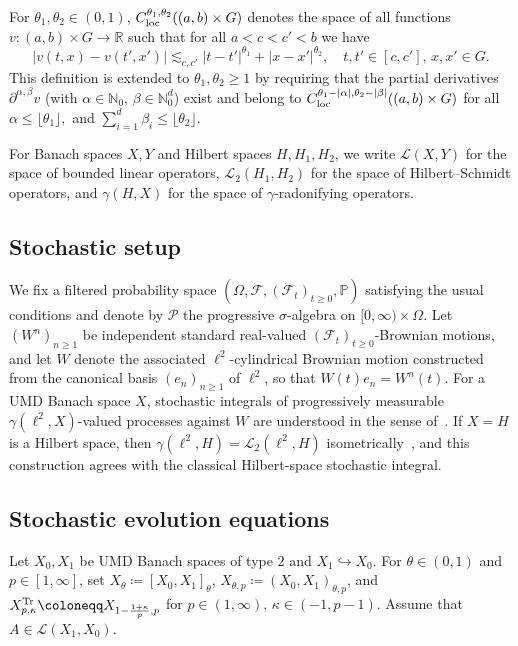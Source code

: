\documentclass[reqno]{amsart}
\newcommand{\N}{\mathbb{N}}
\newcommand{\R}{\mathbb{R}}
\newcommand{\F}{\mathscr{F}}
\newcommand{\sP}{\mathscr{P}}
\newcommand{\sL}{\mathscr{L}}
\newcommand{\ce}{\coloneqq}
\newcommand{\1}{\mathbf{1}}
\newcommand{\loc}{\textup{loc}}
\begin{document}
For $\theta_1,\theta_2\in (0,1)$, $C_\loc^{\theta_1,\theta_2}((a,b)\times G)$ denotes the space of all functions $v\colon (a,b)\times G\to \R$ such that for all $a<c<c'<b$ we have 
$$|v(t,x)-v(t',x')|\lesssim_{c,c'} |t-t'|^{\theta_1}+|x-x'|^{\theta_2}, \quad t,t' \in [c,c'],\,  x,x'\in G.$$
This definition is extended to $\theta_1,\theta_2\ge 1$ by requiring that the partial derivatives $\partial^{\alpha,\beta} v$ (with $\alpha\in \N_0$, $\beta\in \N_0^d$) exist and belong to $C_\loc^{\theta_1-|\alpha|, \theta_2-|\beta|}((a,b)\times G)$ for all $\alpha\le \lfloor \theta_1\rfloor,$ and $\sum_{i=1}^d \beta_i \le \lfloor \theta_2\rfloor$. 

For Banach spaces $X,Y$ and Hilbert spaces $H, H_1, H_2$, we write $\sL(X,Y)$ for the space of bounded linear operators, $\sL_2(H_1,H_2)$ for the space of Hilbert--Schmidt operators, and $\gamma(H,X)$ for the space of $\gamma$-radonifying operators.

\subsection{Stochastic setup}\label{subsec:stochastic_setup}
We fix a filtered probability space $(\Omega,\F,(\F_t)_{t\geq 0}, \mathbb{P})$ satisfying the usual conditions and denote by $\sP$ the progressive $\sigma$-algebra on $[0, \infty)\times\Omega$. Let $(W^n)_{n\geq1}$ be independent standard real-valued $(\F_t)_{t\geq0}$-Brownian motions, and let $W$ denote the associated $\ell^2$-cylindrical Brownian motion constructed from the canonical basis $(e_n)_{n\geq1}$ of $\ell^2$, so that $W(t)e_n=W^n(t)$. For a UMD Banach space $X$, stochastic integrals of progressively measurable $\gamma(\ell^2,X)$-valued processes against $W$ are understood in the sense of~\cite{vanneervenStochasticIntegrationBanach2015}. If $X=H$ is a Hilbert space, then $\gamma(\ell^2,H)=\sL_2(\ell^2,H)$ isometrically~\cite[Ch.~9]{hytonenAnalysisBanachSpaces2017}, and this construction agrees with the classical Hilbert-space stochastic integral. 

\subsection{Stochastic evolution equations}
Let $X_0,X_1$ be UMD Banach spaces of type $2$ and  $X_1\hookrightarrow X_0$. For $\theta\in(0,1)$ and $p\in[1,\infty]$, set
$    X_\theta\ce [X_0,X_1]_\theta
$, $X_{\theta,p}\ce (X_0,X_1)_{\theta,p}$, and $X_{p,\kappa}^{\textup{Tr}}\ce X_{1-\frac{1+\kappa}{p},p}$ for $p\in (1,\infty)$, $\kappa\in (-1,p-1)$. Assume that $A\in \mathscr{L}(X_1,X_0)$.
\end{document}

